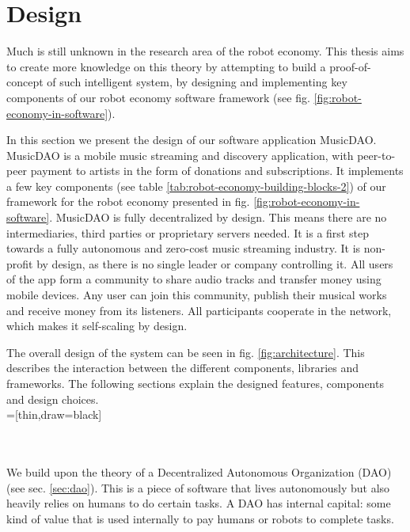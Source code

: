 \chapter{Design}
\label{chap:design}
Much is still unknown in the research area of the robot economy. This thesis aims to create more knowledge on this theory by attempting to build a proof-of-concept of such intelligent system, by designing and implementing key components of our robot economy software framework (see fig. \ref{fig:robot-economy-in-software}).

In this section we present the design of our software application MusicDAO. MusicDAO is a mobile music streaming and discovery application, with peer-to-peer payment to artists in the form of donations and subscriptions. It implements a few key components (see table \ref{tab:robot-economy-building-blocks-2}) of our framework for the robot economy presented in fig. \ref{fig:robot-economy-in-software}. MusicDAO is fully decentralized by design. This means there are no intermediaries, third parties or proprietary servers needed. It is a first step towards a fully autonomous and zero-cost music streaming industry. It is non-profit by design, as there is no single leader or company controlling it. All users of the app form a community to share audio tracks and transfer money using mobile devices. Any user can join this community, publish their musical works and receive money from its listeners. All participants cooperate in the network, which makes it self-scaling by design.

The overall design of the system can be seen in fig. \ref{fig:architecture}. This describes the interaction between the different components, libraries and frameworks. The following sections explain the designed features, components and design choices.
\\

=[thin,draw=black]
\\
\\
We build upon the theory of a Decentralized Autonomous Organization (DAO) (see sec. \ref{sec:dao}). This is a piece of software that lives autonomously but also heavily relies on humans to do certain tasks. A DAO has internal capital: some kind of value that is used internally to pay humans or robots to complete tasks.

